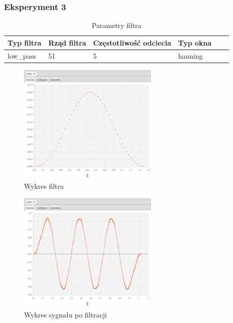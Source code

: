 \documentclass[12pt]{article}
\begin{document}
{{            \subsubsection{Eksperyment 3} {
                \begin{table}[H]
                \centering
                \begin{tabular}{|l|l|l|l|l|l|}
                \hline
                Typ filtra & Rząd filtra & Częstotliwość odciecia & Typ okna  \\\hline
                low\_pass & 51 & 5 & hanning     \\\hline
                \end{tabular}
                \caption{Parametry filtra}
                \end{table}
                \begin{figure}[H]
                \centering
                \includegraphics[width=0.6\textwidth]{img/result/filter/experiment03/data_draw_1c_filter_data_113451.png}
                \caption{Wykres filtra}
                \end{figure}

                \begin{figure}[H]
                \centering
                \includegraphics[width=0.6\textwidth]{img/result/filter/experiment03/data_draw_1c_result_data_113455.png}
                \caption{Wykres sygnału po filtracji}
                \end{figure}
            }
            \newpage

}}
\end{document}
